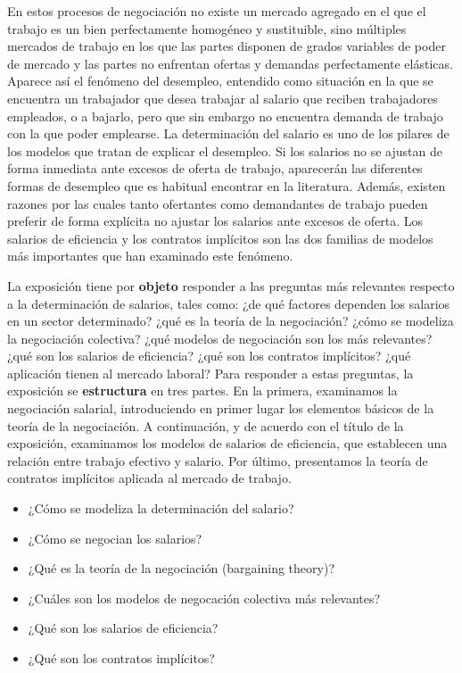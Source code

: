 \documentclass{nuevotema}
\begin{document}
En estos procesos de negociación no existe un mercado agregado en el que el trabajo es un bien perfectamente homogéneo y sustituible, sino múltiples mercados de trabajo en los que las partes disponen de grados variables de poder de mercado y las partes no enfrentan ofertas y demandas perfectamente elásticas. Aparece así el fenómeno del desempleo, entendido como situación en la que se encuentra un trabajador que desea trabajar al salario que reciben trabajadores empleados, o a bajarlo, pero que sin embargo no encuentra demanda de trabajo con la que poder emplearse. La determinación del salario es uno de los pilares de los modelos que tratan de explicar el desempleo. Si los salarios no se ajustan de forma inmediata ante excesos de oferta de trabajo, aparecerán las diferentes formas de desempleo que es habitual encontrar en la literatura. Además, existen razones por las cuales tanto ofertantes como demandantes de trabajo pueden preferir de forma explícita no ajustar los salarios ante excesos de oferta. Los salarios de eficiencia y los contratos implícitos son las dos familias de modelos más importantes que han examinado este fenómeno.

La exposición tiene por \textbf{objeto} responder a las preguntas más relevantes respecto a la determinación de salarios, tales como: ¿de qué factores dependen los salarios en un sector determinado? ¿qué es la teoría de la negociación? ¿cómo se modeliza la negociación colectiva? ¿qué modelos de negociación son los más relevantes? ¿qué son los salarios de eficiencia? ¿qué son los contratos implícitos? ¿qué aplicación tienen al mercado laboral? Para responder a estas preguntas, la exposición se \textbf{estructura} en tres partes. En la primera, examinamos la negociación salarial, introduciendo en primer lugar los elementos básicos de la teoría de la negociación. A continuación, y de acuerdo con el título de la exposición, examinamos los modelos de salarios de eficiencia, que establecen una relación entre trabajo efectivo y salario. Por último, presentamos la teoría de contratos implícitos aplicada al mercado de trabajo.


\begin{itemize}
	\item ¿Cómo se modeliza la determinación del salario?
	\item ¿Cómo se negocian los salarios?
	\item ¿Qué es la teoría de la negociación (bargaining theory)?
	\item ¿Cuáles son los modelos de negocación colectiva más relevantes?
	\item ¿Qué son los salarios de eficiencia?
	\item ¿Qué son los contratos implícitos?
\end{itemize}
\end{document}
